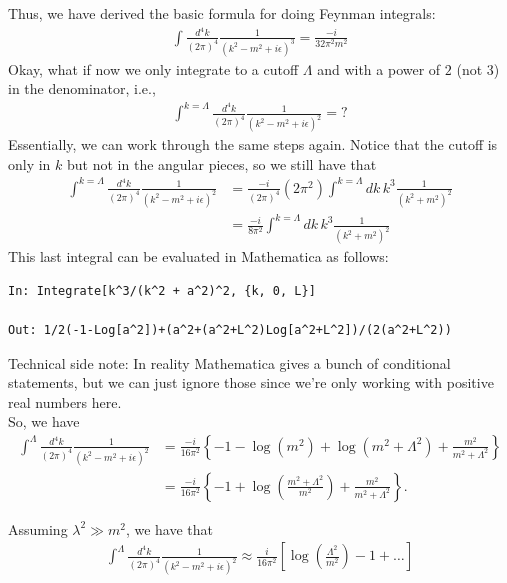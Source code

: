 \documentclass{book}
\theoremstyle{definition}
\newcommand{\f}[2]{\frac{#1}{#2}}
\newcommand{\lp}{\left(}
\newcommand{\rp}{\right)}
\newcommand{\lb}{\left[}
\newcommand{\rb}{\right]}
\newcommand{\lc}{\left\{}
\newcommand{\rc}{\right\}}
\begin{document}
Thus, we have derived the basic formula for doing Feynman integrals:
\begin{align}
\boxed{\int \f{d^4k}{(2\pi)^4} \f{1}{(k^2 - m^2+ i\epsilon)^3} = \f{-i}{32 \pi^2 m^2}}
\end{align}
Okay, what if now we only integrate to a cutoff $\Lambda$ and with a power of $2$ (not $3$) in the denominator, i.e.,
\begin{align}
\int^{k=\Lambda} \f{d^4k}{(2\pi)^4} \f{1}{(k^2 - m^2+ i\epsilon)^2} = ?
\end{align}
Essentially, we can work through the same steps again. Notice that the cutoff is only in $k$ but not in the angular pieces, so we still have that
\begin{align}
\int^{k=\Lambda} \f{d^4k}{(2\pi)^4} \f{1}{(k^2 - m^2+ i\epsilon)^2} &= \f{-i}{(2\pi)^4}(2\pi^2)\int^{k=\Lambda} dk\,k^3\f{1}{(k^2 + m^2)^2}\nonumber\\
&= \f{-i}{8\pi^2}\int^{k=\Lambda} dk\,k^3\f{1}{(k^2 + m^2)^2}
\end{align}
This last integral can be evaluated in Mathematica as follows:
\begin{lstlisting}
In: Integrate[k^3/(k^2 + a^2)^2, {k, 0, L}]

Out: 1/2(-1-Log[a^2])+(a^2+(a^2+L^2)Log[a^2+L^2])/(2(a^2+L^2)) 
\end{lstlisting}

Technical side note: In reality Mathematica gives a bunch of conditional statements, but we can just ignore those since we're only working with positive real numbers here. \\

So, we have
\begin{align}
\int^{\Lambda} \f{d^4k}{(2\pi)^4} \f{1}{(k^2 - m^2+ i\epsilon)^2} &= \f{-i}{16\pi^2}\lc -1 - \log(m^2) + \log(m^2 + \Lambda^2) + \f{m^2 }{m^2 + \Lambda^2} \rc\nonumber\\
&= \f{-i}{16\pi^2}\lc -1  + \log\lp\f{ m^2 + \Lambda^2}{m^2} \rp+ \f{m^2 }{m^2 + \Lambda^2} \rc.
\end{align}

Assuming $\lambda^2 \gg m^2$, we have that
\begin{align}\label{Feynman-int}
\boxed{\int^{\Lambda} \f{d^4k}{(2\pi)^4} \f{1}{(k^2 - m^2+ i\epsilon)^2} \approx \f{i}{16\pi^2} \lb \log\lp \f{\Lambda^2}{m^2} \rp  - 1 + \dots \rb}
\end{align}
\end{document}
